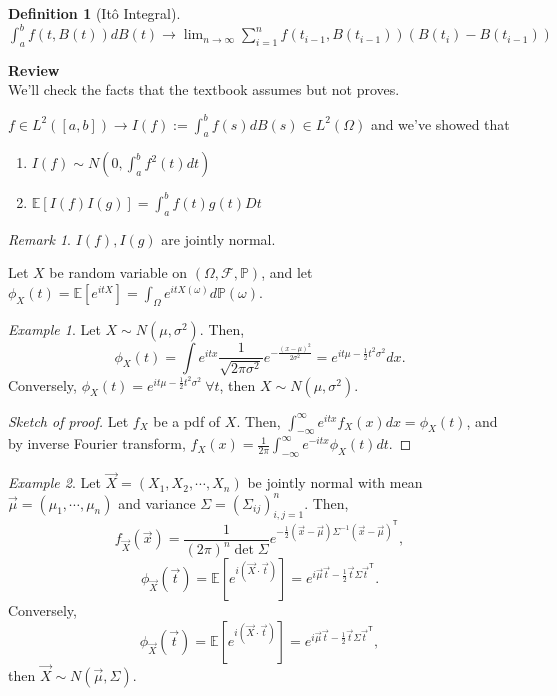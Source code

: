 \documentclass[12pt]{report}
\renewcommand{\P}{\mathbb{P}}
\newcommand{\F}{\mathcal{F}}
\newcommand{\E}{\mathbb{E}}
\renewcommand{\1}{\mathbb{1}}
\renewcommand{\O}{\Omega}
\theoremstyle{break}
\theoremstyle{newdef}
\newtheorem{defn}[thm]{Definition} %
\theoremstyle{remark}
\newtheorem*{exmp}{Example} %
\newtheorem*{rem}{Remark} %
\begin{document}
\begin{defn}[It\^o Integral]
$
\int_a^b f(t,B(t))dB(t) \rightarrow
\lim_{n\rightarrow\infty}\sum_{i=1}^n f(t_{i-1}, B(t_{i-1}))(B(t_i) - B(t_{i-1}))
$
\end{defn}

\vspace{5mm}

\textbf{Review}\\
We'll check the facts that the textbook assumes but not proves.

$f \in L^2([a,b]) \rightarrow I(f) := \int_a^b f(s)dB(s) \in L^2(\O)$ and we've showed that
\begin{enumerate}
\item
$I(f) \sim N(0,\int_a^b f^2(t)dt)$

\item
$\E[I(f)I(g)] = \int_a^b f(t)g(t)Dt$

\end{enumerate}
\begin{rem}
$I(f), I(g)$ are jointly normal.
\end{rem}

Let $X$ be random variable on $(\O,\F,\P)$, and let $\phi_X(t) = \E[e^{itX}] = \int_\O e^{itX(\omega)}d\P(\omega)$.


\begin{exmp}
Let $X \sim N(\mu, \sigma^2)$. Then,
$$
\phi_X(t) = \int e^{itx} \frac{1}{\sqrt{2\pi\sigma^2}} e^{-\frac{(x-\mu)^2}{2\sigma^2}} = e^{it\mu - \frac{1}{2}t^2\sigma^2}dx.
$$
Conversely, $\phi_X(t) = e^{it\mu - \frac{1}{2}t^2\sigma^2} \ \forall t$, then $X \sim N(\mu,\sigma^2)$.
\begin{proof}[Sketch of proof]
Let $f_X$ be a pdf of $X$.
Then, $\int_{-\infty}^\infty e^{itx}f_X(x)dx = \phi_X(t)$, and by inverse Fourier transform, $f_X(x) = \frac{1}{2\pi} \int_{-\infty}^\infty e^{-itx}\phi_X(t)dt$.
\end{proof}
\end{exmp}

\begin{exmp}
Let $\vec{X} = (X_1, X_2, \cdots, X_n)$ be jointly normal with mean $\vec{\mu} = (\mu_1,\cdots,\mu_n)$ and variance $\Sigma = (\Sigma_{ij})_{i,j=1}^n$.
Then,
$$
f_{\vec{X}}(\vec{x}) = \frac{1}{(2\pi)^n\det \Sigma} e^{-\frac{1}{2} (\vec{x}-\vec{\mu})\Sigma^{-1}(\vec{x}-\vec{\mu})^\mathsf{T}},
$$
$$
\phi_{\vec{X}}(\vec{t}) = \E\left[e^{i(\vec{X}\cdot\vec{t})}\right] = e^{i\vec{\mu}\vec{t} - \frac{1}{2}\vec{t} \Sigma \vec{t}^\mathsf{T}}.
$$
Conversely,
$$
\phi_{\vec{X}}(\vec{t}) = \E\left[e^{i(\vec{X}\cdot\vec{t})}\right] = e^{i\vec{\mu}\vec{t} - \frac{1}{2}\vec{t} \Sigma \vec{t}^\mathsf{T}},
$$
then $\vec{X} \sim N(\vec{\mu}, \Sigma)$.
\end{exmp}
\end{document}

